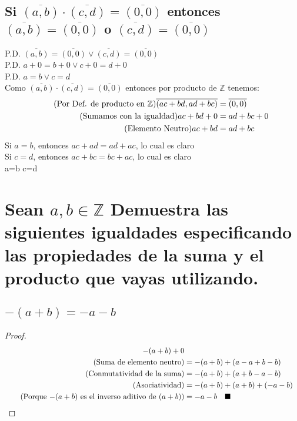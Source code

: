 \documentclass[12pt]{article}
\begin{document}
	    \subsection{Si $\overline{(a,b)}\cdot\overline{(c,d)} = \overline{(0,0)}$ entonces $\overline{(a,b)} = \overline{(0,0)}$ o $\overline{(c,d)} = \overline{(0,0)}$}
	        P.D. $\overline{(a,b)} = \overline{(0,0)} \vee \overline{(c,d)} = \overline{(0,0)}$ \\
	        P.D. $a+0 = b+0 \vee c+0 = d+0$ \\
	        P.D. $a=b \vee c=d$ \\
	        Como $\overline{(a,b)}\cdot\overline{(c,d)}=\overline{(0,0)}$ entonces por producto de $\mathbb{Z}$ tenemos:
	        \begin{align}
    	        \tag{Por Def. de producto en $\mathbb{Z}$} \overline{(ac+bd,ad+bc)} &= \overline{(0,0)} \\
    	        \tag{Sumamos con la igualdad}ac+bd+0 &= ad+bc+0 \\
    	        \tag{Elemento Neutro} ac+bd &= ad+bc
	        \end{align}
	    Si $a=b$, entonces $ac+ad = ad+ac$, lo cual es claro \\
	    Si $c=d$, entonces $ac+bc = bc+ac$, lo cual es claro \\
	    \therefore a=b \vee c=d \quad \blacksquare
	\section{Sean $a,b \in \mathbb{Z}$ Demuestra las siguientes igualdades especificando las propiedades de la suma y el producto que vayas utilizando.}
	    \subsection{$-(a+b)=-a-b$}
	    \begin{proof}
	          \begin{align}
	          \notag
	            -(a+b) + 0 \\ \tag{Suma de elemento neutro}
	            &= -(a+b)+(a-a+b-b)\\ \tag{Conmutatividad de la suma}
	            &= -(a+b)+(a+b-a-b)\\ \tag{Asociatividad}
	            &= -(a+b)+(a+b)+(-a-b)\\ \tag{Porque $-(a+b)$ es el inverso aditivo de $(a+b)$}
	            &= -a-b \quad \blacksquare
	          \end{align}
	        \end{proof}
\end{document}
